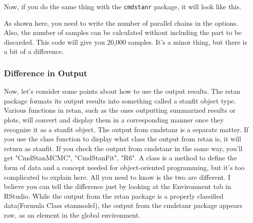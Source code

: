 \documentclass{ltjsbook}
\begin{document}
Now, if you do the same thing with the \verb|cmdstanr| package, it will look like this.

As shown here, you need to write the number of parallel chains in the options. Also, the number of samples can be calculated without including the part to be discarded. This code will give you 20,000 samples. It's a minor thing, but there is a bit of a difference.

\subsubsection{Difference in Output}
Now, let's consider some points about how to use the output results. The rstan package formats its output results into something called a stanfit object type. Various functions in rstan, such as the ones outputting summarized results or plots, will convert and display them in a corresponding manner once they recognize it as a stanfit object. The output from cmdstanr is a separate matter. If you use the class function to display what class the output from rstan is, it will return as stanfit. If you check the output from cmdstanr in the same way, you'll get "CmdStanMCMC", "CmdStanFit", "R6". A class is a method to define the form of data and a concept needed for object-oriented programming, but it's too complicated to explain here. All you need to know is the two are different. I believe you can tell the difference just by looking at the Environment tab in RStudio. While the output from the rstan package is a properly classified data(Formula Class stanmodel), the output from the cmdstanr package appears raw, as an element in the global environment.
\end{document}
